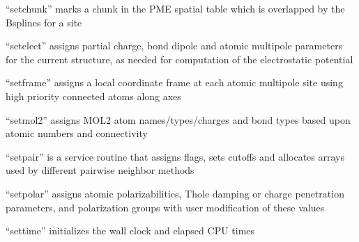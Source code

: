 \documentclass[letterpaper,11pt,english]{sphinxmanual}
\begin{document}
“setchunk” marks a chunk in the PME spatial table which is
overlapped by the B\sphinxhyphen{}splines for a site




“setelect” assigns partial charge, bond dipole and atomic
multipole parameters for the current structure, as needed
for computation of the electrostatic potential





“setframe” assigns a local coordinate frame at each atomic
multipole site using high priority connected atoms along axes







“setmol2” assigns MOL2 atom names/types/charges and bond types
based upon atomic numbers and connectivity



“setpair” is a service routine that assigns flags, sets cutoffs
and allocates arrays used by different pairwise neighbor methods


“setpolar” assigns atomic polarizabilities, Thole damping or
charge penetration parameters, and polarization groups with
user modification of these values




“settime” initializes the wall clock and elapsed CPU times
\end{document}
